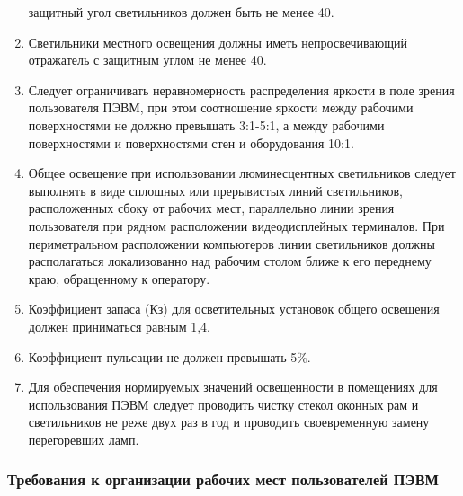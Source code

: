 \begin{enumerate}
 защитный угол светильников должен быть не менее 40\textdegree{}.
 \item Светильники местного освещения должны иметь непросвечивающий отражатель с защитным углом не менее 40\textdegree{}.
 \item Следует ограничивать неравномерность распределения яркости в поле зрения пользователя ПЭВМ, 
 при этом соотношение яркости между рабочими поверхностями не должно превышать 3:1-5:1, 
 а между рабочими поверхностями и поверхностями стен и оборудования 10:1.
 \item Общее освещение при использовании люминесцентных светильников следует 
 выполнять в виде сплошных или прерывистых линий светильников, расположенных сбоку от рабочих мест, 
 параллельно линии зрения пользователя при рядном расположении видеодисплейных терминалов. 
 При периметральном расположении компьютеров линии светильников должны располагаться локализованно 
 над рабочим столом ближе к его переднему краю, обращенному к оператору.
 \item Коэффициент запаса (Кз) для осветительных установок общего освещения должен приниматься равным 1,4.
 \item Коэффициент пульсации не должен превышать 5\%.
 \item Для обеспечения нормируемых значений освещенности в помещениях для использования 
 ПЭВМ следует проводить чистку стекол оконных рам и светильников не реже двух раз в год и 
 проводить своевременную замену перегоревших ламп.
\end{enumerate}

\subsubsection{Требования к организации рабочих мест пользователей ПЭВМ}

